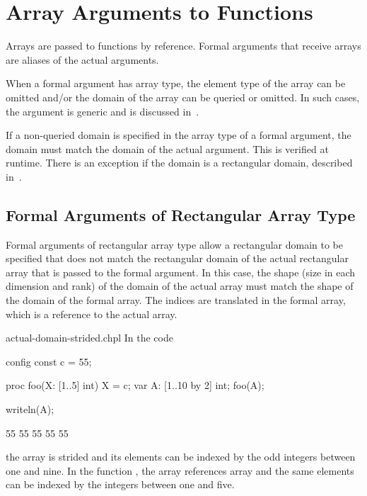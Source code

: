 \section{Array Arguments to Functions}
\label{Array_Arguments_To_Functions}

Arrays are passed to functions by reference.  Formal arguments that
receive arrays are aliases of the actual arguments.

%

When a formal argument has array type, the element type of the array
can be omitted and/or the domain of the array can be queried or
omitted.  In such cases, the argument is generic and is discussed
in~.

If a non-queried domain is specified in the array type of a formal
argument, the domain must match the domain of the actual argument.
This is verified at runtime.  There is an exception if the domain is
a rectangular domain, described
in~.


\subsection{Formal Arguments of Rectangular Array Type}
\label{Formal_Arguments_of_Rectangular_Array_Type}

Formal arguments of rectangular array type allow a rectangular domain
to be specified that does not match the rectangular domain of the
actual rectangular array that is passed to the formal argument.  In
this case, the shape (size in each dimension and rank) of the domain
of the actual array must match the shape of the domain of the formal
array.  The indices are translated in the formal array, which is a
reference to the actual array.

\begin{chapelexample}{actual-domain-strided.chpl}
In the code
\begin{chapelpre}
config const c = 55;
\end{chapelpre}
\begin{chapel}
proc foo(X: [1..5] int) { X = c; }
var A: [1..10 by 2] int;
foo(A);
\end{chapel}
\begin{chapelpost}
writeln(A);
\end{chapelpost}
\begin{chapeloutput}
55 55 55 55 55
\end{chapeloutput}
the array  is strided and its elements can be indexed by the
odd integers between one and nine.  In the function , the
array  references array  and the same elements can be
indexed by the integers between one and five.
\end{chapelexample}


